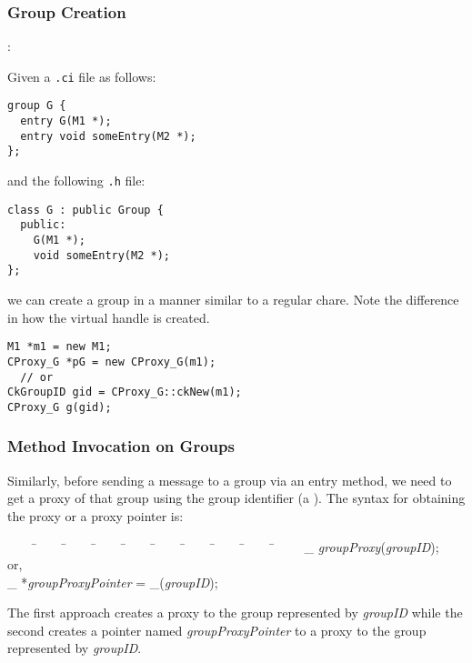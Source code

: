 \subsubsection{Group Creation}

:

\noindent Given a {\tt .ci} file as follows:

\begin{verbatim}
group G {
  entry G(M1 *);
  entry void someEntry(M2 *);
};
\end{verbatim}

\noindent and the following {\tt .h} file:

\begin{verbatim}
class G : public Group {
  public:
    G(M1 *);
    void someEntry(M2 *);
};
\end{verbatim}

we can create a group in a manner similar to a regular chare.  Note
the difference in how the virtual handle is created.

\begin{verbatim}
M1 *m1 = new M1;
CProxy_G *pG = new CProxy_G(m1);
  // or
CkGroupID gid = CProxy_G::ckNew(m1);
CProxy_G g(gid);
\end{verbatim}

\subsubsection{Method Invocation on Groups}

Similarly, before sending a message to a group via an entry
method, we need to get a proxy of that group using the group identifier (a
). The syntax for obtaining the proxy or a proxy
pointer is:

\begin{tabbing} ~~~~ \=~~~~ \=~~~~ \=~~~~ \=~~~~ \=~~~~ \=~~~~ \=~~~~ \=~~~~
\=~~~~ \kill \> \_ {\it groupProxy}({\it groupID}); \\
\> \> or, \\ \> \_ *{\it groupProxyPointer} = \_({\it groupID}); \end{tabbing}

The first approach creates a proxy to the group represented by {\it groupID}
while the second creates a pointer named {\it groupProxyPointer} to a proxy to
the group represented by {\it groupID}. 


